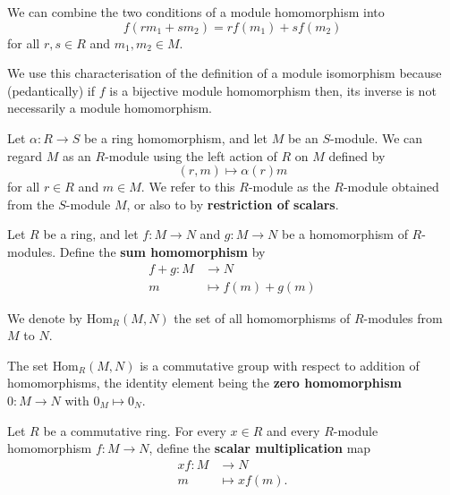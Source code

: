 \documentclass[12pt, a4paper]{article}
\begin{document}
\begin{mdnote}
    We can combine the two conditions of a module homomorphism into 
    \[f(rm_1+sm_2) = rf(m_1)+sf(m_2)\]
    for all \(r,s \in R\) and \(m_1,m_2 \in M\).
\end{mdnote}

\begin{mdremark}
    We use this characterisation of the definition of a module isomorphism because (pedantically) if \(f\) is a bijective module homomorphism then, its inverse is not necessarily a module homomorphism.
\end{mdremark}

\begin{definition}
    Let \(\alpha:R \to S\) be a ring homomorphism, and let \(M\) be an \(S\)-module. We can regard \(M\) as an \(R\)-module using the left action of \(R\) on \(M\) defined by 
    \[(r,m) \mapsto \alpha(r)m\]
    for all \(r\in R\) and \(m\in M\). We refer to this \(R\)-module as the \(R\)-module obtained from the \(S\)-module \(M\), or also to by \textbf{restriction of scalars}.
\end{definition}

\begin{definition}
    Let \(R\) be a ring, and let \(f:M \to N\) and \(g:M \to N\) be a homomorphism of \(R\)-modules. Define the \textbf{sum homomorphism} by 
    \[\begin{aligned}
        f+g :M &\to N \\
        m &\mapsto f(m)+g(m)
    \end{aligned}\]
\end{definition}

\begin{definition}
    We denote by \(\text{Hom}_R(M,N)\) the set of all homomorphisms of \(R\)-modules from \(M\) to \(N\).
\end{definition}

\begin{theorem}
    The set \(\text{Hom}_R(M,N)\) is a commutative group with respect to addition of homomorphisms, the identity element being the \textbf{zero homomorphism} \(0:M \to N\) with \(0_M \mapsto 0_N\).
\end{theorem}

\begin{definition}
    Let \(R\) be a commutative ring. For every \(x\in R\) and every \(R\)-module homomorphism \(f: M \to N\), define the \textbf{scalar multiplication} map 
    \[\begin{aligned}
        xf:M &\to N \\
        m&\mapsto xf(m).
    \end{aligned}\]
\end{definition}
\end{document}
